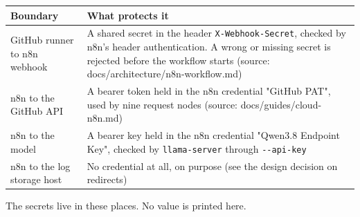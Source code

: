 \documentclass[11pt,a4paper]{report}
\begin{document}
\begin{longtable}{>{\raggedright\arraybackslash}p{0.318\dimexpr\linewidth-4\tabcolsep\relax}>{\raggedright\arraybackslash}p{0.682\dimexpr\linewidth-4\tabcolsep\relax}}
\toprule
\textbf{Boundary} & \textbf{What protects it} \\
\midrule
\endhead
GitHub runner to n8n webhook & A shared secret in the header \texttt{X-\allowbreak{}Webhook-\allowbreak{}Secret}, checked by n8n's header authentication. A wrong or missing secret is rejected before the workflow starts (source: docs/architecture/n8n-workflow.md) \\
n8n to the GitHub API & A bearer token held in the n8n credential "GitHub PAT", used by nine request nodes (source: docs/guides/cloud-n8n.md) \\
n8n to the model & A bearer key held in the n8n credential "Qwen3.8 Endpoint Key", checked by \texttt{llama-\allowbreak{}server} through \texttt{-\allowbreak{}-\allowbreak{}api-\allowbreak{}key} \\
n8n to the log storage host & No credential at all, on purpose (see the design decision on redirects) \\
\bottomrule
\end{longtable}

The secrets live in these places. No value is printed here.
\end{document}
